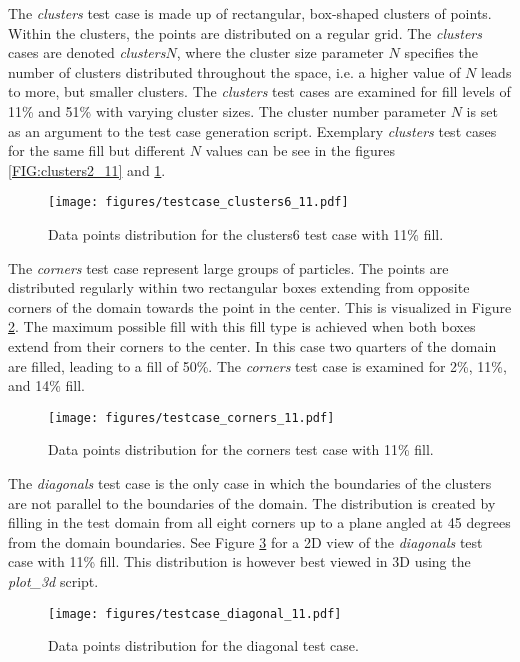 The {\itshape clusters} test case is made up of rectangular, box-shaped clusters of points. Within the clusters, the points are distributed on a regular grid. The {\itshape clusters} cases are denoted {\itshape clusters}$N$, where the cluster size parameter $N$ specifies the number of clusters distributed throughout the space, i.e. a higher value of $N$ leads to more, but smaller clusters. The {\itshape clusters} test cases are examined for fill levels of 11\% and 51\% with varying cluster sizes. The cluster number parameter $N$ is set as an argument to the test case generation script. Exemplary {\itshape clusters} test cases for the same fill but different $N$ values can be see in the figures \ref{FIG:clusters2_11} and \ref{FIG:clusters6_11}. 

\begin{figure}[h]
	\centering
	\texttt{[image: figures/testcase\_clusters6\_11.pdf]}
	\caption{Data points distribution for the clusters6 test case with 11\% fill.}
	\label{FIG:clusters6_11}
\end{figure}

The {\itshape corners} test case represent large groups of particles. The points are distributed regularly within two rectangular boxes extending from opposite corners of the domain towards the point in the center. This is visualized in Figure \ref{FIG:corners_11}. The maximum possible fill with this fill type is achieved when both boxes extend from their corners to the center. In this case two quarters of the domain are filled, leading to a fill of 50\%. The {\itshape corners} test case is examined for 2\%, 11\%, and 14\% fill.

\begin{figure}[h]
	\centering
	\texttt{[image: figures/testcase\_corners\_11.pdf]}
	\caption{Data points distribution for the corners test case with 11\% fill.}
	\label{FIG:corners_11}
\end{figure}

The {\itshape diagonals} test case is the only case in which the boundaries of the clusters are not parallel to the boundaries of the domain. The distribution is created by filling in the test domain from all eight corners up to a plane angled at 45 degrees from the domain boundaries. See Figure \ref{FIG:diagonals_11} for a 2D view of the {\itshape diagonals} test case with 11\% fill. This distribution is however best viewed in 3D using the {\itshape plot\_3d} script.

\begin{figure}[h]
	\centering
	\texttt{[image: figures/testcase\_diagonal\_11.pdf]}
	\caption{Data points distribution for the diagonal test case.}
	\label{FIG:diagonals_11}
\end{figure}

